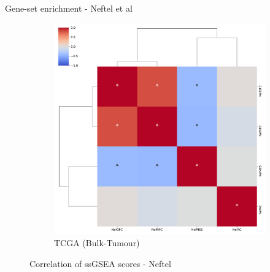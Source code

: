 \documentclass[aspectratio=169,9pt]{beamer}
\begin{document}
\begin{frame}{Gene-set enrichment - Neftel et al}
\begin{adjustwidth}{-5cm}{-5cm}
\begin{figure}
\begin{subfigure}[c]{0.48\textwidth}
                    \includegraphics[width=\textwidth]{GSEA_TCGA_corrplot_Nef}
                    \caption{TCGA (Bulk-Tumour)}
                \end{subfigure}
                \caption{Correlation of ssGSEA scores - Neftel}
            \end{figure}
        \end{adjustwidth}
    \end{frame}
\end{document}
